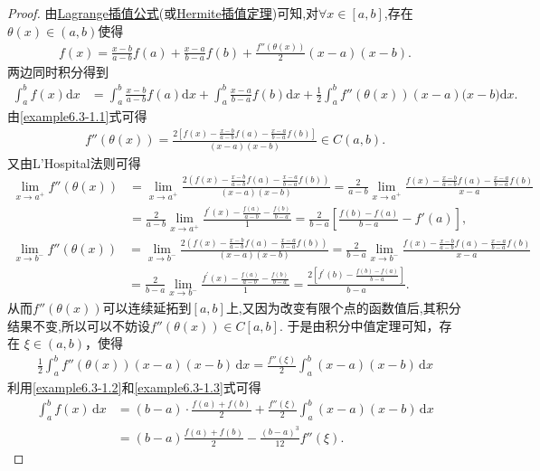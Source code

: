 \documentclass[../../main.tex]{subfiles}%
\begin{document}
\begin{proof}
由\hyperref[proposition:Lagrange插值公式]{Lagrange插值公式}(或\hyperref[theorem:Hermite插值定理]{Hermite插值定理})可知,对$\forall x\in [a,b]$,存在$\theta (x)\in (a,b)$使得
\begin{align}\label{example6.3-1.1}
f(x) = \frac{x - b}{a - b} f(a) + \frac{x - a}{b - a} f(b) + \frac{f''(\theta (x))}{2} (x - a)(x - b).
\end{align}
两边同时积分得到
\begin{align}
\int_a^b{f(x)\mathrm{d}x}&=\int_a^b{\frac{x-b}{a-b}f(a)\mathrm{d}x}+\int_a^b{\frac{x-a}{b-a}f(b)\mathrm{d}x}+\frac{1}{2}\int_a^b{f'' (\theta (x) )(x-a)(x-b})\mathrm{d}x.\label{example6.3-1.2}
\end{align}
由\eqref{example6.3-1.1}式可得
\begin{align*}
f'' (\theta (x) )=\frac{2\left[ f\left( x \right) -\frac{x-b}{a-b}f(a)-\frac{x-a}{b-a}f\left( b \right) \right]}{(x-a)(x-b)}\in C\left( a,b \right) .
\end{align*}
又由L'Hospital法则可得
\begin{align*}
\underset{x\rightarrow a^+}{\lim}f'' \left( \theta \left( x \right) \right) &=\underset{x\rightarrow a^+}{\lim}\frac{2\left( f\left( x \right) -\frac{x-b}{a-b}f(a)-\frac{x-a}{b-a}f\left( b \right) \right)}{(x-a)(x-b)}=\frac{2}{a-b}\underset{x\rightarrow a^+}{\lim}\frac{f\left( x \right) -\frac{x-b}{a-b}f(a)-\frac{x-a}{b-a}f\left( b \right)}{x-a}
\\
&=\frac{2}{a-b}\lim_{x\rightarrow a^+} \frac{f^{\prime}(x)-\frac{f(a)}{a-b}-\frac{f(b)}{b-a}}{1}=\frac{2}{b-a}\left[ \frac{f\left( b \right) -f\left( a \right)}{b-a}-f' \left( a \right) \right] ,   
\end{align*}
\begin{align*}
\underset{x\rightarrow b^-}{\lim}f'' \left( \theta \left( x \right) \right) &=\underset{x\rightarrow b^-}{\lim}\frac{2\left( f(x)-\frac{x-b}{a-b}f(a)-\frac{x-a}{b-a}f(b) \right)}{(x-a)(x-b)}=\frac{2}{b-a}\underset{x\rightarrow b^-}{\lim}\frac{f\left( x \right) -\frac{x-b}{a-b}f(a)-\frac{x-a}{b-a}f\left( b \right)}{x-a}
\\
&=\frac{2}{b-a}\lim_{x\rightarrow b^-} \frac{f^{\prime}(x)-\frac{f(a)}{a-b}-\frac{f(b)}{b-a}}{1}=\frac{2\left[ f^{\prime}(b)-\frac{f(b)-f(a)}{b-a} \right]}{b-a}.   
\end{align*}
从而$f'' \left( \theta \left( x \right) \right)$可以连续延拓到$[a,b]$上,又因为改变有限个点的函数值后,其积分结果不变,所以可以不妨设$f''(\theta(x))\in C[a,b]$.
于是由积分中值定理可知，存在 $\xi \in (a, b)$，使得
\begin{align}
\frac{1}{2} \int_a^b f''(\theta (x)) (x-a)(x-b) \, \mathrm{d}x = \frac{f''(\xi)}{2} \int_a^b (x-a)(x-b) \, \mathrm{d}x \label{example6.3-1.3}
\end{align}
利用\eqref{example6.3-1.2}和\eqref{example6.3-1.3}式可得
\begin{align*}
\int_a^b f(x) \, \mathrm{d}x &= (b-a) \cdot \frac{f(a) + f(b)}{2} + \frac{f''(\xi)}{2} \int_a^b (x-a)(x-b) \, \mathrm{d}x \\
&= (b-a) \frac{f(a) + f(b)}{2} - \frac{(b-a)^3}{12} f''(\xi). 
\end{align*}
\end{proof}
\end{document}
